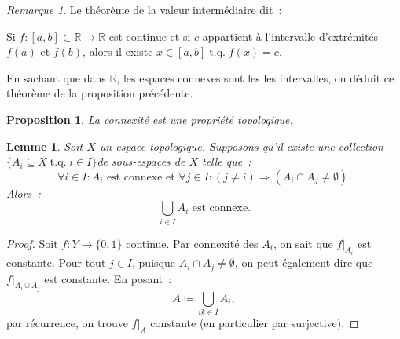 \documentclass{report}
\newtheorem{prp}[thm]{Proposition}
\newtheorem{lem}[thm]{Lemme}
\theoremstyle{definition}
\theoremstyle{remark}
\newtheorem*{rmq}{Remarque}
\DeclareMathOperator{\tq}{\text{ t.q. }}
\newcommand{\restr}[2]{\left.#1\right|_{#2}}
\newcommand{\R}{\mathbb R}
\begin{document}
	\begin{rmq}Le théorème de la valeur intermédiaire dit~:

	Si $f : [a, b] \subset \R \to \R$ est continue et si $c$ appartient à l'intervalle d'extrémités $f(a)$ et $f(b)$, alors il existe $x \in [a, b] \tq f(x) = c$.

	En sachant que dans $\R$, les espaces connexes sont les les intervalles, on déduit ce théorème de la proposition précédente.
	\end{rmq}

	\begin{prp} La connexité est une propriété topologique.
	\end{prp}

	\begin{lem} Soit $X$ un espace topologique. Supposons qu'il existe une collection $\{A_i \subseteq X \tq i \in I\}$de sous-espaces de $X$ telle que~:
	\[\forall i \in I : A_i \text{ est connexe et } \forall j \in I : (j \neq i) \Rightarrow (A_i \cap A_j \neq \emptyset).\]
	Alors~:
	\[\bigcup_{i \in I}A_i \text{ est connexe}.\]
	\end{lem}

	\begin{proof} Soit $f : Y \to \{0, 1\}$ continue. Par connexité des $A_i$, on sait que $\restr f{A_i}$ est constante. Pour tout $j \in I$, puisque
	$A_i \cap A_j \neq \emptyset$, on peut également dire que $\restr f{A_i \cup A_j}$ est constante. En posant~:
	\[A \coloneqq \bigcup_{ik \in I}A_i,\]
	par récurrence, on trouve $\restr fA$ constante (en particulier par surjective).
	\end{proof}
\end{document}
